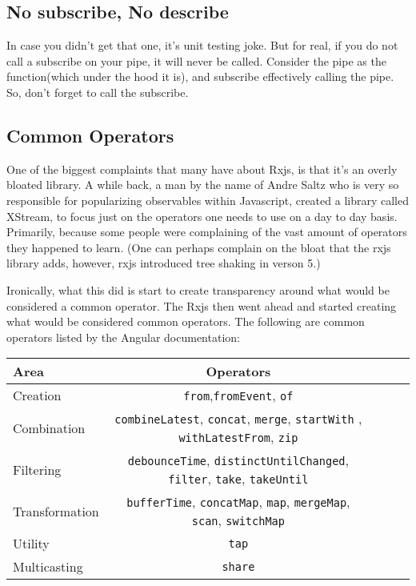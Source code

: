 
\subsection{No subscribe, No describe}
In case you didn't get that one, it's unit testing joke. But for real, if you 
do not call a subscribe on your pipe, it will never be called. Consider the 
pipe as the function(which under the hood it is), and subscribe effectively
calling the pipe. So, don't forget to call the subscribe. 

\subsection{Common Operators}
One of the biggest complaints that many have about Rxjs, is that it's an 
overly bloated library. A while back, a man by the name of Andre Saltz who is
very so responsible for popularizing observables within Javascript, created a 
library called XStream, to focus just on the operators one needs to use on a 
day to day basis. Primarily, because some people were complaining of the vast 
amount of operators they happened to learn. (One can perhaps complain on the 
bloat that the rxjs library adds, however, rxjs introduced tree shaking in 
verson 5.)

Ironically, what this did is start to create transparency around what would be 
considered a common operator. The Rxjs then went ahead and started creating 
what would be considered common operators. The following are common operators
listed by the Angular documentation:
  
\begin{center}
  \begin{tabular}{@{} l *4c @{}}
    \toprule
    {\color{red}Area} & Operators \\
    \midrule
    Creation & \texttt{from},\texttt{fromEvent}, \texttt{of}\tabularnewline
    Combination & \texttt{combineLatest}, \texttt{concat}, \texttt{merge},
  \texttt{startWith} , \texttt{withLatestFrom},
  \texttt{zip}\tabularnewline
  Filtering & \texttt{debounceTime}, \texttt{distinctUntilChanged},
  \texttt{filter}, \texttt{take}, \texttt{takeUntil}\tabularnewline
  Transformation & \texttt{bufferTime}, \texttt{concatMap}, \texttt{map},
  \texttt{mergeMap}, \texttt{scan}, \texttt{switchMap}\tabularnewline
  Utility & \texttt{tap}\tabularnewline
  Multicasting & \texttt{share}\tabularnewline
  \end{tabular}
\end{center}  

